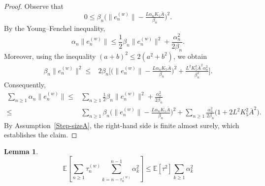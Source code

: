 \documentclass{article}
\newtheorem{lemma}[theorem]{Lemma}
\begin{document}
\begin{proof}
Observe that
\[
    0 \le
    \beta_n
    \Big(
    \|e_n^{(w)}\|
    -
    \tfrac{L\alpha_n K_5 \bar{A}}{\beta_n}
    \Big)^2.
\]
By the Young--Fenchel inequality,
\[
    \alpha_n \|e_n^{(w)}\|
    \le
    \frac{1}{2}\beta_n \|e_n^{(w)}\|^2
    +
    \frac{\alpha_n^2}{2\beta_n}.
\]
Moreover, using the inequality $(a+b)^2 \le 2(a^2+b^2)$, we obtain
\begin{equation*}
\begin{split}
    \beta_n \|e_n^{(w)}\|^2
    \le{}&
    2\beta_n
    \Bigg[
    \Big(
    \|e_n^{(w)}\|
    -
    \frac{L\alpha_n K_5 \bar{A}}{\beta_n}
    \Big)^2
    +
    \frac{L^2 K_5^2 \bar{A}^2 \alpha_n^2}{\beta_n^2}
    \Bigg].
\end{split}
\end{equation*}
Consequently,
\[
\begin{aligned}
    \sum_{n \ge 1} \alpha_n \|e_n^{(w)}\|
    \le{}&
    \sum_{n \ge 1}
    \frac{1}{2}\beta_n \|e_n^{(w)}\|^2
    +
    \frac{\alpha_n^2}{2\beta_n}
    \\[0.2em]
    \le{}&
    \sum_{n \ge 1}
    \beta_n
    \Big(
    \|e_n^{(w)}\|
    -
    \tfrac{L\alpha_n K_5 \bar{A}}{\beta_n}
    \Big)^2
    +
    \sum_{n \ge 1}
    \frac{\alpha_n^2}{2\beta_n}
    \big(
    1
    +
    2L^2 K_5^2 \bar{A}^2
    \big).
\end{aligned}
\]
By Assumption~\ref{Step-sizeA}, the right-hand side is finite almost surely, which
establishes the claim.
\end{proof}

\begin{lemma}
\label{lem:delay-summable}
\[
\mathbb{E}[\sum_{n \ge 1}
\tau_n^{(w)}
\sum_{k=n-\tau_n^{(w)}}^{n-1}
\alpha_k^2] \leq \mathbb{E}[\tau^2]
\sum_{k \ge 1}
\alpha_k^2
\]
\end{lemma}
\end{document}
